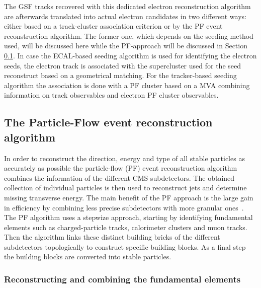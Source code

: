 The GSF tracks recovered with this dedicated electron reconstruction algorithm are afterwards translated into actual electron candidates in two different ways: either based on a track-cluster association criterion or by the PF event reconstruction algorithm. The former one, which depends on the seeding method used, will be discussed here while the PF-approach will be discussed in Section \ref{subsec::PF}.
In case the ECAL-based seeding algorithm is used for identifying the electron seeds, the electron track is associated with the supercluster used for the seed reconstruct based on a geometrical matching. For the tracker-based seeding algorithm the association is done with a PF cluster based on a MVA combining information on track observables and electron PF cluster observables. %

\subsection{The Particle-Flow event reconstruction algorithm} \label{subsec::PF}

In order to reconstruct the direction, energy and type of all stable particles as accurately as possible the particle-flow (PF) event reconstruction algorithm combines the information of the different CMS subdetectors. The obtained collection of individual particles is then used to reconstruct jets and determine missing transverse energy.
The main benefit of the PF approach is the large gain in efficiency by combining less precise subdetectors with more granular ones~\cite{PF, PFComm, PFLeptComm}.
\\
The PF algorithm uses a stepwize approach, starting by identifying fundamental elements such as charged-particle tracks, calorimeter clusters and muon tracks. Then the algorithm links these distinct building bricks of the different subdetectors topologically to construct specific building blocks. As a final step the building blocks are converted into stable particles.

\subsubsection*{Reconstructing and combining the fundamental elements}


